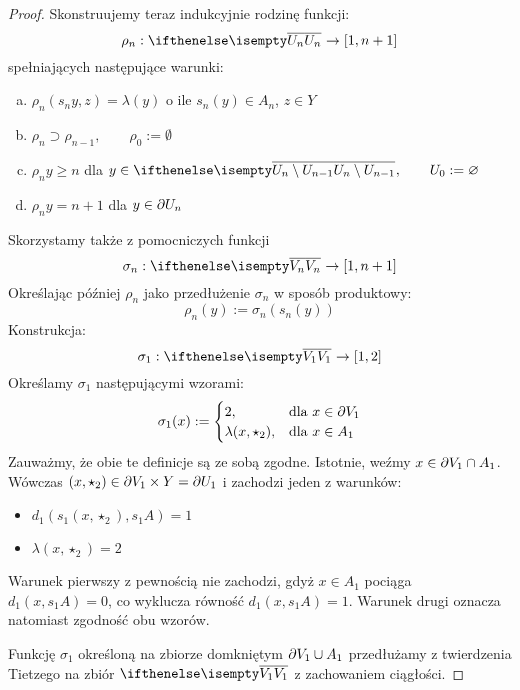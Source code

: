 \begin{thm}
\begin{proof}
  Skonstruujemy teraz indukcyjnie rodzinę funkcji:
  \[\rho_n: \cl{U_n} \rightarrow [1, n+1]\]
  spełniających następujące warunki:
  \begin{enumerate}[(a)]
    \item \label{induction-1} $\rho_n(s_n y, z) = \lambda(y)$ o ile $s_n(y) \in A_n$, $z \in Y$
    \item \label{induction-2} $\rho_n \supset \rho_{n-1}, \qquad \rho_0 := \emptyset$
    \item \label{induction-3} $\rho_n y \geq n$ dla $y \in \cl{U_n \setminus U_{n-1}},\qquad U_0 := \emptyset$
    \item \label{induction-4} $\rho_n y = n+1$ dla $y \in \partial U_n$
  \end{enumerate}
  Skorzystamy także z pomocniczych funkcji
  \[
    \sigma_n: \cl{V_n} \rightarrow [1,n+1]
  \]
  Określając później $\rho_n$ jako przedłużenie $\sigma_n$ w sposób produktowy:
  \[
    \rho_n(y) := \sigma_n(s_n(y))
  \]
  Konstrukcja:
  \[
    \sigma_1: \cl{V_1} \rightarrow [1,2]
  \]
  Określamy $\sigma_1$ następującymi wzorami:
  \[
  \sigma_1(x) := 
    \begin{cases}
      2,&\mbox{dla }x \in \partial V_1 \\
      \lambda(x, \star_2),& \mbox{dla }x \in A_1 
    \end{cases}
  \]
  Zauważmy, że obie te definicje są ze sobą zgodne. Istotnie, weźmy $x \in \partial V_1 \cap A_1$. Wówczas $(x, \star_2) \in \partial V_1 \times Y = \partial U_1$ i zachodzi jeden z warunków:
  \begin{itemize}
    \item $d_1(s_1 (x, \star_2), s_1 A) = 1$
    \item $\lambda(x, \star_2) = 2$
  \end{itemize}
  Warunek pierwszy z pewnością nie zachodzi, gdyż $x \in A_1$ pociąga $d_1(x, s_1 A) = 0$, co wyklucza równość $d_1(x, s_1 A) = 1$.
  Warunek drugi oznacza natomiast zgodność obu wzorów.
  
  Funkcję $\sigma_1$ określoną na zbiorze domkniętym $\partial V_1 \cup A_1$ przedłużamy z twierdzenia Tietzego na zbiór $\cl{V_1}$ z zachowaniem ciągłości.
  

\end{proof}
\end{thm}
